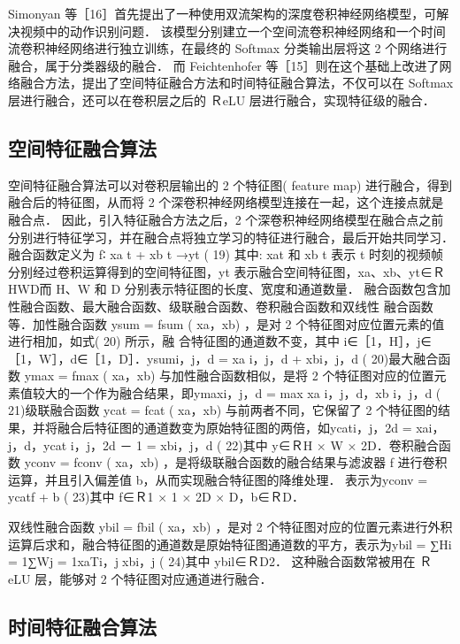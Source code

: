 Simonyan 等［16］首先提出了一种使用双流架构的深度卷积神经网络模型，可解决视频中的动作识别问题． 该模型分别建立一个空间流卷积神经网络和一个时间流卷积神经网络进行独立训练，在最终的 Softmax 分类输出层将这 2 个网络进行融合，属于分类器级的融合． 而 Feichtenhofer 等［15］则在这个基础上改进了网络融合方法，提出了空间特征融合方法和时间特征融合算法，不仅可以在 Softmax 层进行融合，还可以在卷积层之后的 ＲeLU 层进行融合，实现特征级的融合．
\subsection{空间特征融合算法}
空间特征融合算法可以对卷积层输出的 2 个特征图( feature map) 进行融合，得到融合后的特征图，从而将 2 个深卷积神经网络模型连接在一起，这个连接点就是融合点． 因此，引入特征融合方法之后，2 个深卷积神经网络模型在融合点之前分别进行特征学习，并在融合点将独立学习的特征进行融合，最后开始共同学习． 融合函数定义为
f∶ xa
t + xb
t →yt ( 19)
其中: xat 和 xb
t 表示 t 时刻的视频帧分别经过卷积运算得到的空间特征图，yt 表示融合空间特征图，xa、xb、yt∈ＲHWD而 H、W 和 D 分别表示特征图的长度、宽度和通道数量． 融合函数包含加性融合函数、最大融合函数、级联融合函数、卷积融合函数和双线性
融合函数等．加性融合函数 ysum = fsum ( xa，xb) ，是对 2 个特征图对应位置元素的值进行相加，如式( 20) 所示，融
合特征图的通道数不变，其中 i∈［1，H］，j∈［1，W］，d∈［1，D］．ysumi，j，d = xa
i，j，d + xbi，j，d ( 20)最大融合函数 ymax = fmax ( xa，xb) 与加性融合函数相似，是将 2 个特征图对应的位置元素值较大的一个作为融合结果，即ymaxi，j，d = max{ xa	i，j，d，xb	i，j，d } ( 21)级联融合函数 ycat = fcat ( xa，xb) 与前两者不同，它保留了 2 个特征图的结果，并将融合后特征图的通道数变为原始特征图的两倍，如ycati，j，2d = xai，j，d，ycat
i，j，2d － 1 = xbi，j，d ( 22)其中 y∈ＲH × W × 2D．卷积融合函数 yconv = fconv ( xa，xb) ，是将级联融合函数的融合结果与滤波器 f 进行卷积运算，并且引入偏差值 b，从而实现融合特征图的降维处理． 表示为yconv = ycatf + b ( 23)其中 f∈Ｒ1 × 1 × 2D × D，b∈ＲD．

双线性融合函数 ybil = fbil ( xa，xb) ，是对 2 个特征图对应的位置元素进行外积运算后求和，融合特征图的通道数是原始特征图通道数的平方，表示为ybil = ∑Hi = 1∑Wj = 1xaTi，jxbi，j ( 24)其中 ybil∈ＲD2． 这种融合函数常被用在 ＲeLU 层，能够对 2 个特征图对应通道进行融合．

\subsection{时间特征融合算法}

